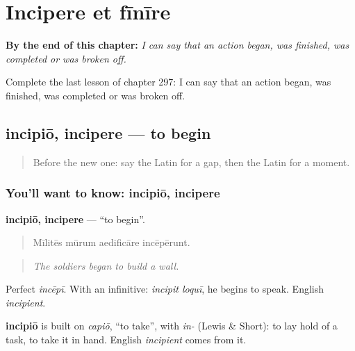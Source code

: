 
\chapter{Incipere et fīnīre}
\label{ch:la-incipere-et-finire}

\begin{chapteropening}
\textbf{By the end of this chapter:} \emph{I can say that an action began, was finished, was completed or was broken off.}

Complete the last lesson of chapter 297: I can say that an action began, was finished, was completed or was broken off.
\end{chapteropening}

\section[incipiō, incipere]{incipiō, incipere — to begin}

\label{lesson:LA-C297-incipio}



\begin{quote}
Before the new one: say the Latin for a gap, then the Latin for a moment.
\end{quote}

\subsection*{You'll want to know: incipiō, incipere}
\textbf{incipiō, incipere} — \textquotedblleft{}to begin\textquotedblright{}.

\begin{quote}
Mīlitēs mūrum aedificāre incēpērunt.
\end{quote}

\begin{quote}
\emph{The soldiers began to build a wall.}
\end{quote}

Perfect \emph{incēpī}. With an infinitive: \emph{incipit loquī}, he begins to speak. English \emph{incipient}.

\begin{cousinweb}
\textbf{incipiō} is built on \emph{capiō}, \textquotedblleft{}to take\textquotedblright{}, with \emph{in-} (Lewis \& Short): to lay hold of a task, to take it in hand. English \emph{incipient} comes from it.
\end{cousinweb}

